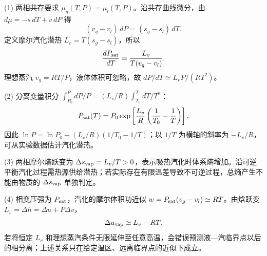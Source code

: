 (1) 两相共存要求 \(\mu_g(T,P)=\mu_l(T,P)\)。沿共存曲线微分，由 \(d\mu=-s\,dT+v\,dP\) 得
\[
(v_g-v_l)\,dP=(s_g-s_l)\,dT.
\]
定义摩尔汽化潜热 \(L_v=T(s_g-s_l)\)，所以
\[
\frac{dP_{\rm sat}}{dT}=\frac{L_v}{T(v_g-v_l)}.
\]
理想蒸汽 \(v_g=RT/P\)，液体体积可忽略，故 \(dP/dT\simeq L_vP/(RT^2)\)。

(2) 分离变量积分 \(\int_{P_0}^{P}dP/P=(L_v/R)\int_{T_0}^{T}dT/T^2\)：
\[
P_{\rm sat}(T)=P_0\exp\left[\frac{L_v}{R}\left(\frac1{T_0}-\frac1T\right)\right].
\]
因此 \(\ln P=\ln P_0+(L_v/R)(1/T_0-1/T)\)；以 \(1/T\) 为横轴的斜率为 \(-L_v/R\)，可从实验数据估计汽化潜热。

(3) 两相摩尔熵跃变为 \(\Delta s_{\rm vap}=L_v/T>0\)，表示吸热汽化时体系熵增加。沿可逆平衡汽化过程需热源供给潜热；若实际存在有限温差导致不可逆过程，总熵产生不能由物质的 \(\Delta s_{\rm vap}\) 单独判定。

(4) 相变压强为 \(P_{\rm sat}\)，汽化的摩尔体积功近似 \(w=P_{\rm sat}(v_g-v_l)\simeq RT\)。由焓跃变 \(L_v=\Delta h=\Delta u+P\Delta v\)，
\[
\Delta u_{\rm vap}\simeq L_v-RT.
\]
若将恒定 \(L_v\) 和理想蒸汽条件无限延伸至任意高温，会错误预测液—汽临界点以后的相分离；上述关系只在给定温区、远离临界点的近似下成立。
